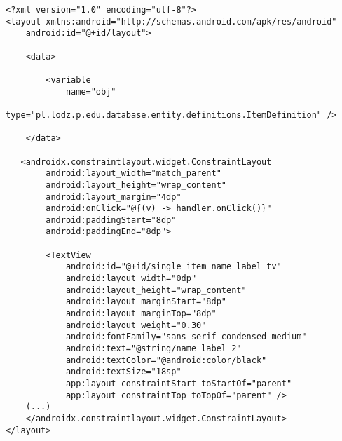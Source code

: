 \documentclass[a4paper,12pt]{article}
\begin{document}
\begin{lstlisting}[caption=Fragment widoku pojedynczego elementu na liście przedmiotów (reszta pól wyświetalana jest analogicznie),label={lst:single-item-layout}]
<?xml version="1.0" encoding="utf-8"?>
<layout xmlns:android="http://schemas.android.com/apk/res/android"
    android:id="@+id/layout">

    <data>

        <variable
            name="obj"
            type="pl.lodz.p.edu.database.entity.definitions.ItemDefinition" />

    </data>

   <androidx.constraintlayout.widget.ConstraintLayout
        android:layout_width="match_parent"
        android:layout_height="wrap_content"
        android:layout_margin="4dp"
        android:onClick="@{(v) -> handler.onClick()}"
        android:paddingStart="8dp"
        android:paddingEnd="8dp">

        <TextView
            android:id="@+id/single_item_name_label_tv"
            android:layout_width="0dp"
            android:layout_height="wrap_content"
            android:layout_marginStart="8dp"
            android:layout_marginTop="8dp"
            android:layout_weight="0.30"
            android:fontFamily="sans-serif-condensed-medium"
            android:text="@string/name_label_2"
            android:textColor="@android:color/black"
            android:textSize="18sp"
            app:layout_constraintStart_toStartOf="parent"
            app:layout_constraintTop_toTopOf="parent" />
	(...)
    </androidx.constraintlayout.widget.ConstraintLayout>
</layout>
\end{lstlisting}
\end{document}
